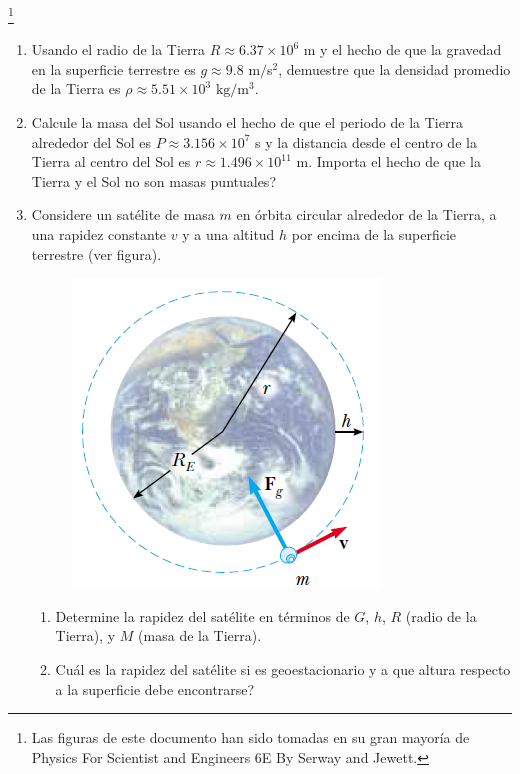\documentclass[11pt,twocolumn]{article}
\title{}
\author{}
\date{}
\begin{document}
\pagestyle{empty}
\sffamily
{}
\footnote{Las figuras de este documento han sido tomadas en su gran mayoría de Physics For Scientist and Engineers 6E By Serway and Jewett.}

\begin{enumerate}

\item Usando el radio de la Tierra $R \approx 6.37 \times 10^{6}$ m y el hecho de que la gravedad en la superficie terrestre es $g \approx 9.8$ m$/$s$^{2}$, demuestre que la densidad promedio de la Tierra es $\rho \approx 5.51 \times 10^{3}$ $\text{kg}/\text{m}^{3}$.

\item Calcule la masa del Sol usando el hecho de que el periodo de la Tierra alrededor del Sol es $P \approx 3.156 \times 10^{7}$ s y la distancia desde el centro de la Tierra al centro del Sol es $r \approx 1.496 \times 10^{11}$ m. Importa el hecho de que la Tierra y el Sol no son masas puntuales?

\item Considere un satélite de masa $m$ en órbita circular alrededor de la Tierra, a una rapidez constante $v$ y a una altitud $h$ por encima de la superficie terrestre (ver figura).
\begin{figure}[h]
\centering
\includegraphics[scale=0.35]{fig1}
\end{figure}
\begin{enumerate}
\item Determine la rapidez del satélite en términos de $G$, $h$, $R$ (radio de la Tierra), y $M$ (masa de la Tierra).
\item Cuál es la rapidez del satélite si es geoestacionario y a que altura respecto a la superficie debe encontrarse?
\end{enumerate}


\end{enumerate}
\end{document}
